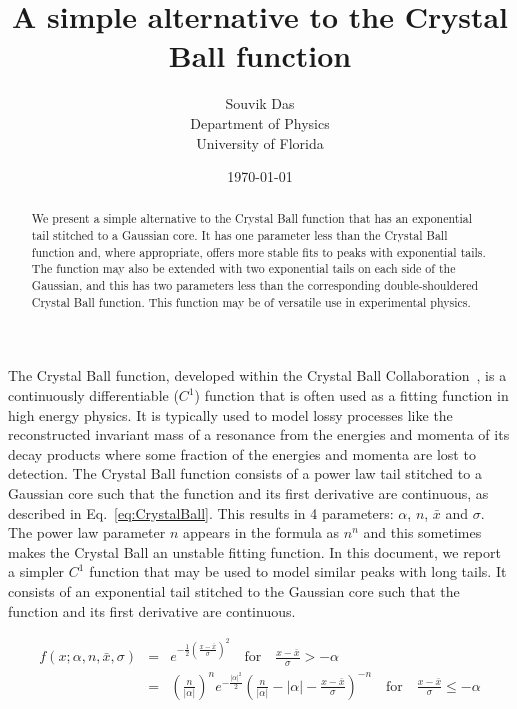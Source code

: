 \documentclass[10pt,letterpaper]{article}
\begin{document}
\title{A simple alternative to the Crystal Ball function}
\date{\today}
\author{Souvik Das\\ Department of Physics \\ University of Florida}
\maketitle

\begin{abstract}
We present a simple alternative to the Crystal Ball function that has an exponential tail stitched to a Gaussian core. It has one parameter less than the Crystal Ball function and, where appropriate, offers more stable fits to peaks with exponential tails. The function may also be extended with two exponential tails on each side of the Gaussian, and this has two parameters less than the corresponding double-shouldered Crystal Ball function. This function may be of versatile use in experimental physics.
\end{abstract}

\bigskip

The Crystal Ball function, developed within the Crystal Ball Collaboration~\cite{Oreglia:1980cs, Skwarnicki:1986xj}, is a continuously differentiable ($C^1$) function that is often used as a fitting function in high energy physics. It is typically used to model lossy processes like the reconstructed invariant mass of a resonance from the energies and momenta of its decay products where some fraction of the energies and momenta are lost to detection. The Crystal Ball function consists of a power law tail stitched to a Gaussian core such that the function and its first derivative are continuous, as described in Eq.~\ref{eq:CrystalBall}. This results in 4 parameters: $\alpha$, $n$, $\bar{x}$ and $\sigma$. The power law parameter $n$ appears in the formula as $n^n$ and this sometimes makes the Crystal Ball an unstable fitting function. In this document, we report a simpler $C^1$ function that may be used to model similar peaks with long tails. It consists of an exponential tail stitched to the Gaussian core such that the function and its first derivative are continuous.

\begin{eqnarray}
\label{eq:CrystalBall}
f(x; \alpha, n, \bar{x}, \sigma) &=& e^{-\frac{1}{2}\left({\frac{x-\bar{x}}{\sigma}}\right)^2} \quad \textrm{for} \quad \frac{x-\bar{x}}{\sigma} > -\alpha \\
                                 &=& \left(\frac{n}{|\alpha|}\right)^n e^{-\frac{|\alpha|^2}{2}} \left( \frac{n}{|\alpha|} - |\alpha| - \frac{x-\bar{x}}{\sigma} \right)^{-n} \quad \textrm{for} \quad \frac{x-\bar{x}}{\sigma} \leq -\alpha \nonumber
\end{eqnarray} \\
\end{document}
